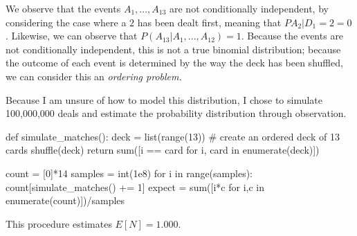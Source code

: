 We observe that the events ${A_1,...,A_13}$ are not conditionally
independent, by considering the case where a $2$ has been dealt first,
meaning that $P{A_2|D_1=2}=0$. Likewise, we can observe that
$P(A_13|A_1,...,A_12)=1$. Because the events are not conditionally
independent, this is not a true binomial distribution; because the
outcome of each event is determined by the way the deck has been
shuffled, we can consider this an \emph{ordering problem.}

Because I am unsure of how to model this distribution, I chose to
simulate 100,000,000 deals and estimate the probability
distribution through observation.

\begin{python}
def simulate_matches():
  deck = list(range(13)) # create an ordered deck of 13 cards
  shuffle(deck)
  return sum([i == card for i, card in enumerate(deck)])

count = [0]*14
samples = int(1e8)
for i in range(samples):
  count[simulate_matches() += 1]
expect = sum([i*c for i,c in enumerate(count)])/samples
\end{python}

This procedure estimates $E[N] = 1.000$.
